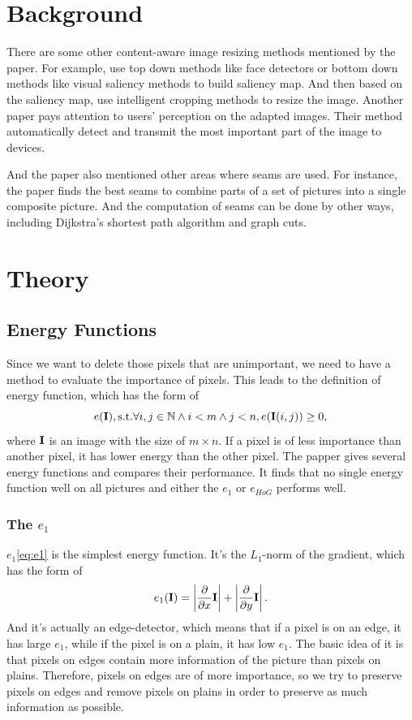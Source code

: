 \documentclass[final]{cvpr}
\begin{document}
\section{Background}
There are some other content-aware image resizing methods mentioned by the paper\cite{avidan2007seam}.
For example, use top down methods like face detectors\cite{viola2001rapid} or bottom down methods like visual saliency methods\cite{itti1998model} to build saliency map.
And then based on the saliency map, use intelligent cropping methods to resize the image\cite{suh2003automatic}.
Another paper\cite{chen2003visual} pays attention to users' perception on the adapted images.
Their method automatically detect and transmit the most important part of the image to devices.

And the paper\cite{avidan2007seam} also mentioned other areas where seams are used.
For instance, the paper\cite{agarwala2004interactive} finds the best seams to combine parts of a set of pictures into a single composite picture.
And the computation of seams can be done by other ways, including Dijkstra's shortest path algorithm\cite{davis1998mosaics} and graph cuts\cite{boykov2001interactive}.
\section{Theory}
\subsection{Energy Functions}
Since we want to delete those pixels that are unimportant, we need to have a method to evaluate the importance of pixels.
This leads to the definition of energy function, which has the form of
\begin{equation}
    e(\textbf I),\text{s.t.}\forall i,j\in\mathbb{N}\wedge i<m\wedge j<n,e(\textbf I(i,j))\ge0,
    \label{eq:energy_function}
\end{equation}
where $\textbf I$ is an image with the size of $m\times n$.
If a pixel is of less importance than another pixel, it has lower energy than the other pixel.
The papper\cite{avidan2007seam} gives several energy functions and compares their performance.
It finds that no single energy function  well on all pictures and either the $e_1$ or $e_{HoG}$ performs well.
\subsubsection{The $e_1$}
$e_1$\ref{eq:e1} is the simplest energy function.
It's the $L_1$-norm of the gradient, which has the form of
\begin{equation}
    e_1(\textbf{I})=\left|\frac\partial{\partial x}\textbf I\right|+\left|\frac\partial{\partial y}\textbf I\right|.
    \label{eq:e1}
\end{equation}
And it's actually an edge-detector, which means that if a pixel is on an edge, it has large $e_1$, while if the pixel is on a plain, it has low $e_1$.
The basic idea of it is that pixels on edges contain more information of the picture than pixels on plains.
Therefore, pixels on edges are of more importance, so we try to preserve pixels on edges and remove pixels on plains in order to preserve as much information as possible.
\end{document}
